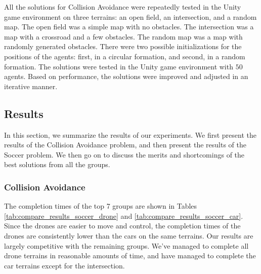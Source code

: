 \documentclass[a4paper,12pt]{article}
\begin{document}
All the solutions for Collision Avoidance were repeatedly tested in the Unity game environment on three terrains: an open field, an intersection, and a random map. The open field was a simple map with no obstacles. The intersection was a map with a crossroad and a few obstacles. The random map was a map with randomly generated obstacles. There were two possible initializations for the positions of the agents: first, in a circular formation, and second, in a random formation. The solutions were tested in the Unity game environment with $50$ agents. Based on performance, the solutions were improved and adjusted in an iterative manner.


\subsection{Results}
\label{subsec:results}
In this section, we summarize the results of our experiments. We first present the results of the Collision Avoidance problem, and then present the results of the Soccer problem. We then go on to discuss the merits and shortcomings of the best solutions from all the groups.

\subsubsection{Collision Avoidance}
\label{subsubsec:collision_avoidance_results}

The completion times of the top 7 groups are shown in Tables \ref{tab:compare_results_soccer_drone} and \ref{tab:compare_results_soccer_car}. Since the drones are easier to move and control, the completion times of the drones are consistently lower than the cars on the same terrains. Our results are largely competitive with the remaining groups. We've managed to complete all drone terrains in reasonable amounts of time, and have managed to complete the car terrains except for the intersection.




\end{document}
